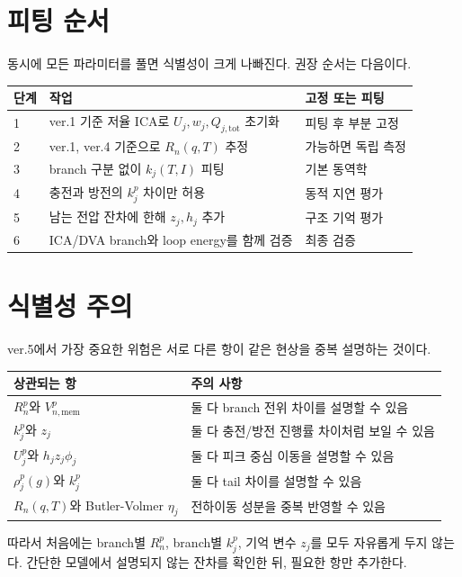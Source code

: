 \documentclass[11pt,a4paper]{article}
\newcommand{\tot}{\mathrm{tot}}
\begin{document}
\section{피팅 순서}
동시에 모든 파라미터를 풀면 식별성이 크게 나빠진다. 권장 순서는 다음이다.
\begin{longtable}{p{}p{}p{}}
\toprule
단계 & 작업 & 고정 또는 피팅 \\
\midrule
\endhead
1 & ver.1 기준 저율 ICA로 \(U_j,w_j,Q_{j,\tot}\) 초기화 & 피팅 후 부분 고정 \\
2 & ver.1, ver.4 기준으로 \(R_n(q,T)\) 추정 & 가능하면 독립 측정 \\
3 & branch 구분 없이 \(k_j(T,I)\) 피팅 & 기본 동역학 \\
4 & 충전과 방전의 \(k_j^p\) 차이만 허용 & 동적 지연 평가 \\
5 & 남는 전압 잔차에 한해 \(z_j,h_j\) 추가 & 구조 기억 평가 \\
6 & ICA/DVA branch와 loop energy를 함께 검증 & 최종 검증 \\
\bottomrule
\end{longtable}

\section{식별성 주의}
ver.5에서 가장 중요한 위험은 서로 다른 항이 같은 현상을 중복 설명하는 것이다.
\begin{longtable}{p{}p{}}
\toprule
상관되는 항 & 주의 사항 \\
\midrule
\endhead
\(R_n^p\)와 \(V_{n,\mathrm{mem}}^p\) & 둘 다 branch 전위 차이를 설명할 수 있음 \\
\(k_j^p\)와 \(z_j\) & 둘 다 충전/방전 진행률 차이처럼 보일 수 있음 \\
\(U_j^p\)와 \(h_jz_j\phi_j\) & 둘 다 피크 중심 이동을 설명할 수 있음 \\
\(\rho_j^p(g)\)와 \(k_j^p\) & 둘 다 tail 차이를 설명할 수 있음 \\
\(R_n(q,T)\)와 Butler-Volmer \(\eta_j\) & 전하이동 성분을 중복 반영할 수 있음 \\
\bottomrule
\end{longtable}

따라서 처음에는 branch별 \(R_n^p\), branch별 \(k_j^p\), 기억 변수 \(z_j\)를 모두 자유롭게 두지 않는다. 간단한 모델에서 설명되지 않는 잔차를 확인한 뒤, 필요한 항만 추가한다.
\end{document}
